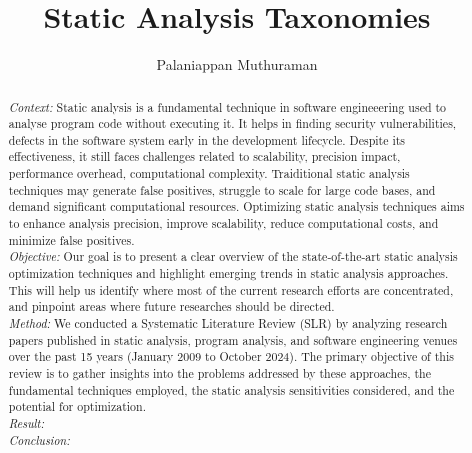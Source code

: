 \documentclass[manuscript]{acmart}
\begin{document}
\title{Static Analysis Taxonomies}

\author{Palaniappan Muthuraman}
\authornotemark[1]

\begin{abstract}
\textit{Context:}
Static analysis is a fundamental technique in software engineeering used to analyse program code without executing it.
It helps in finding security vulnerabilities, defects in the software system early in the development lifecycle.
Despite its effectiveness, it still faces challenges related to scalability, precision impact, performance overhead, computational complexity.
Traiditional static analysis techniques may generate false positives, struggle to scale for large code bases, and demand significant computational resources.
Optimizing static analysis techniques aims to enhance analysis precision, improve scalability, reduce computational costs, and minimize false positives. \\
\textit{Objective:}
Our goal is to present a clear overview of the state-of-the-art static analysis optimization techniques and highlight emerging trends in static analysis approaches.
This will help us identify where most of the current research efforts are concentrated, and pinpoint areas where future researches should be directed.\\
\textit{Method:}
We conducted a Systematic Literature Review (SLR) by analyzing \noofpapers research papers published in static analysis, program analysis, and software engineering venues over the past 15 years (January 2009 to October 2024).
The primary objective of this review is to gather insights into the problems addressed by these approaches, the fundamental techniques employed, the static analysis sensitivities considered, and the potential for optimization. \\
\textit{Result:}
 \\
\textit{Conclusion:}
\end{abstract}

\maketitle






\end{document}
